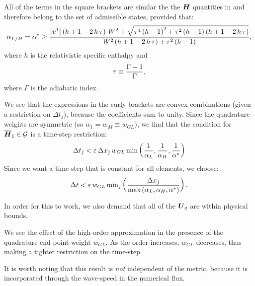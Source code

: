 All of the terms in the square brackets are similar the the $\boldsymbol{H}$ quantities in \citet{Qin2016} and therefore belong to the set of admissible states, provided that:
\begin{equation}
    \alpha_{L/H}=\alpha^{*}\geq\frac{\left|v^{1}\right|\left(h+1-2\,h\,\tau\right)\,W^{2}+\sqrt{\tau^{4}\left(h-1\right)^{2}+\tau^{2}\left(h-1\right)\left(h+1-2\,h\,\tau\right)}}{W^{2}\left(h+1-2\,h\,\tau\right)+\tau^{2}\left(h-1\right)},
\end{equation}
where $h$ is the relativistic specific enthalpy and
\begin{equation}
    \tau\equiv\frac{\Gamma-1}{\Gamma},
\end{equation}
where $\Gamma$ is the adiabatic index.

We see that the expressions in the curly brackets are convex combinations (given a restriction on $\Delta t_{j}$), because the coefficients sum to unity. Since the quadrature weights are symmetric (so $w_{1}=w_{M}\equiv w_{GL}$), we find that the condition for $\overline{\boldsymbol{H}}_{1}\in\mathcal{G}$ is a time-step restriction:
\begin{equation}
\Delta t_{j}<\varepsilon\,\Delta x_{j}\,w_{GL}\,\text{min}\left(\frac{1}{\alpha_{L}},\frac{1}{\alpha_{H}},\frac{1}{\alpha^{*}}\right)
\end{equation}
Since we want a time-step that is constant for all elements, we choose:
\begin{equation}
\Delta t<\varepsilon\,w_{GL}\,\text{min}_{j}\left(\frac{\Delta x_{j}}{\text{max}\left(\alpha_{L},\alpha_{H},\alpha^{*}\right)}\right).
\end{equation}

 In order for this to work, we also demand that all of the $\boldsymbol{U}_{q}$ are within physical bounds.

 We see the effect of the high-order approximation in the presence of the quadrature end-point weight $w_{GL}$. As the order increases, $w_{GL}$ decreases, thus making a tighter restriction on the time-step.

 It is worth noting that this result is \textit{not} independent of the metric, because it is incorporated through the wave-speed in the numerical flux.
